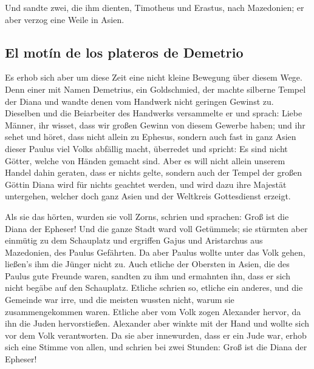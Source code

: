  Und sandte zwei, die ihm dienten, Timotheus und Erastus,
nach Mazedonien; er aber verzog eine Weile in Asien.

\hypertarget{el-motuxedn-de-los-plateros-de-demetrio}{%
\subsection{El motín de los plateros de
Demetrio}\label{el-motuxedn-de-los-plateros-de-demetrio}}

 Es erhob sich aber um diese Zeit eine nicht kleine
Bewegung über diesem Wege.  Denn einer mit Namen
Demetrius, ein Goldschmied, der machte silberne Tempel der Diana und
wandte denen vom Handwerk nicht geringen Gewinst zu. 
Dieselben und die Beiarbeiter des Handwerks versammelte er und sprach:
Liebe Männer, ihr wisset, dass wir großen Gewinn von diesem Gewerbe
haben;  und ihr sehet und höret, dass nicht allein zu
Ephesus, sondern auch fast in ganz Asien dieser Paulus viel Volks
abfällig macht, überredet und spricht: Es sind nicht Götter, welche von
Händen gemacht sind.  Aber es will nicht allein unserem
Handel dahin geraten, dass er nichts gelte, sondern auch der Tempel der
großen Göttin Diana wird für nichts geachtet werden, und wird dazu ihre
Majestät untergehen, welcher doch ganz Asien und der Weltkreis
Gottesdienst erzeigt.

 Als sie das hörten, wurden sie voll Zorns, schrien und
sprachen: Groß ist die Diana der Epheser!  Und die ganze
Stadt ward voll Getümmels; sie stürmten aber einmütig zu dem Schauplatz
und ergriffen Gajus und Aristarchus aus Mazedonien, des Paulus
Gefährten.  Da aber Paulus wollte unter das Volk gehen,
ließen's ihm die Jünger nicht zu.  Auch etliche der
Obersten in Asien, die des Paulus gute Freunde waren, sandten zu ihm und
ermahnten ihn, dass er sich nicht begäbe auf den Schauplatz.
 Etliche schrien so, etliche ein anderes, und die
Gemeinde war irre, und die meisten wussten nicht, warum sie
zusammengekommen waren.  Etliche aber vom Volk zogen
Alexander hervor, da ihn die Juden hervorstießen. Alexander aber winkte
mit der Hand und wollte sich vor dem Volk verantworten. 
Da sie aber innewurden, dass er ein Jude war, erhob sich eine Stimme von
allen, und schrien bei zwei Stunden: Groß ist die Diana der Epheser!

